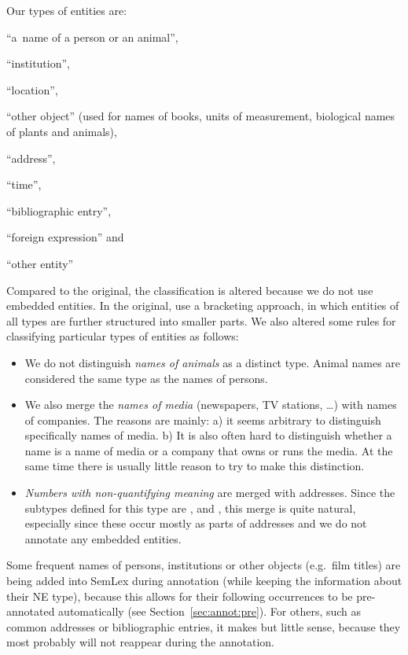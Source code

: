 Our types of entities are:
\begin{compactenum}
\item ``a~name of a person or an animal'', 
\item``institution'', 
\item``location'', 
\item``other object'' (used for names of books, units of measurement, biological names of plants and animals), 
\item``address'', 
\item``time'', 
\item``bibliographic entry'', 
\item``foreign expression'' and 
\item``other entity''
\end{compactenum}

Compared to the original, the classification is altered because we do not use embedded entities. In the original, \citeauthor{sevcikova:2007} use a bracketing approach, in which entities of all types are further structured into smaller parts. We also altered some rules for classifying particular types of entities as follows:
\begin{itemize}
\item  We do not distinguish \emph{names of animals} as a distinct type. Animal names are considered the same type as the names of persons.
\item We also merge the \emph{names of media} (newspapers, TV stations, \ldots) with names of companies. The reasons are mainly: a) it seems arbitrary to distinguish specifically names of media. b) It is also often hard to distinguish whether a name is a name of media or a company that owns or runs the media. At the same time there is usually little reason to try to make this distinction.
\item \emph{Numbers with non-quantifying meaning} are merged with addresses. Since the subtypes defined for this type are ,  and , this merge is quite natural, especially since these occur mostly as parts of addresses and we do not annotate any embedded entities.
\end{itemize}

Some frequent names of persons, institutions or other objects (e.g.~film titles) are being added into SemLex during annotation (while keeping the information about their NE type), because this allows for their following occurrences to be pre-annotated automatically (see Section~\ref{sec:annot:pre}). For others, such as common addresses or bibliographic entries, it makes but little sense, because they most probably will not reappear during the annotation. 


